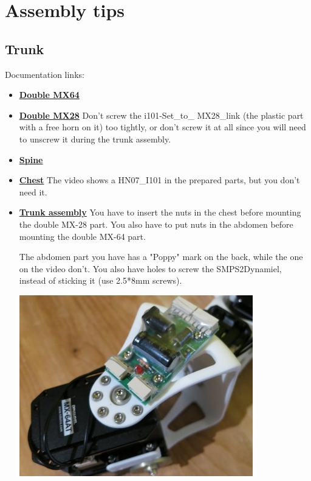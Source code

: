 \documentclass{article}
\begin{document}
\section{Assembly tips}

\subsection{Trunk} 
 
Documentation links:

\begin{itemize}
\item \textbf{\href{https://github.com/poppy-project/Robotis-library/blob/master/doc/en/double\_MX64\_assembly.md}{Double MX64}}
\item \textbf{\href{https://github.com/poppy-project/Robotis-library/blob/master/doc/en/double\_MX28\_assembly.md}{Double MX28}} Don't screw the i101-Set\_to\_ MX28\_link (the plastic part with a free horn on it) too tightly, or don't screw it at all since you will need to unscrew it during the trunk assembly.
\item \textbf{\href{https://github.com/poppy-project/Poppy-multiarticulated-torso/blob/master/doc/en/subassembly/spine\_assembly\_instructions.md}{Spine}}
\item \textbf{\href{https://github.com/poppy-project/Poppy-multiarticulated-torso/blob/master/doc/en/subassembly/chest\_assembly\_instructions.md}{Chest}} The video shows a HN07\_I101 in the prepared parts, but you don't need it.
\item \textbf{\href{https://github.com/poppy-project/Poppy-multiarticulated-torso/blob/master/doc/en/5\_DoFs\_humanoid\_spine.md}{Trunk assembly}} You have to insert the nuts in the chest before mounting the double MX-28 part. You also have to put nuts in the abdomen before mounting the double MX-64 part.

The abdomen part you have has a "Poppy" mark on the back, while the one on the video don't. You also have holes to screw the SMPS2Dynamiel, instead of sticking it (use 2.5*8mm screws).
\begin{center}
  \includegraphics[width=0.8\textwidth]{screwed_SMPS}
\end{center}
\end{itemize}
\end{document}
